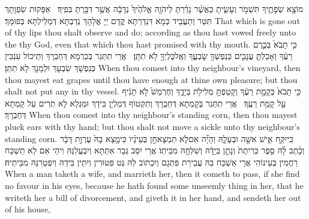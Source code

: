 {מוֹצָ֥א שְׂפָתֶ֖יךָ תִּשְׁמֹ֣ר וְעָשִׂ֑יתָ כַּאֲשֶׁ֨ר נָדַ֜רְתָּ לַיהֹוָ֤ה אֱלֹהֶ֙יךָ֙ נְדָבָ֔ה אֲשֶׁ֥ר דִּבַּ֖רְתָּ בְּפִֽיךָ׃ \setuma }
{אַפָּקוּת שִׂפְוָתָךְ תִּטַּר וְתַעֲבֵיד כְּמָא דִּנְדַרְתָּא קֳדָם יְיָ אֱלָהָךְ נְדַבְתָּא דְּמַלֵּילְתָּא בְּפוּמָּךְ׃}
{That which is gone out of thy lips thou shalt observe and do; according as thou hast vowed freely unto the \lord\space thy God, even that which thou hast promised with thy mouth.}{}
{כִּ֤י תָבֹא֙ בְּכֶ֣רֶם רֵעֶ֔ךָ וְאָכַלְתָּ֧ עֲנָבִ֛ים כְּנַפְשְׁךָ֖ שׇׂבְעֶ֑ךָ וְאֶֽל\maqqaf כֶּלְיְךָ֖ לֹ֥א תִתֵּֽן׃ \setuma }
{אֲרֵי תִתַּגַר בְּכַרְמָא דְּחַבְרָךְ וְתֵיכוֹל עִנְבִּין כְּנַפְשָׁךְ שִׂבְעָךְ וּלְמָנָךְ לָא תִתֵּן׃}
{When thou comest into thy neighbour’s vineyard, then thou mayest eat grapes until thou have enough at thine own pleasure; but thou shalt not put any in thy vessel.}{}
{כִּ֤י תָבֹא֙ בְּקָמַ֣ת רֵעֶ֔ךָ וְקָטַפְתָּ֥ מְלִילֹ֖ת בְּיָדֶ֑ךָ וְחֶרְמֵשׁ֙ לֹ֣א תָנִ֔יף עַ֖ל קָמַ֥ת רֵעֶֽךָ׃ \setuma }
{אֲרֵי תִתַּגַר בְּקָמְתָא דְּחַבְרָךְ וְתִקְטוֹף דְּמַלְיָן בִּידָךְ וּמַגְּלָא לָא תְרִים עַל קָמְתָא דְּחַבְרָךְ׃}
{When thou comest into thy neighbour’s standing corn, then thou mayest pluck ears with thy hand; but thou shalt not move a sickle unto thy neighbour’s standing corn.}{}
\newperek
{}%
{כִּֽי\maqqaf יִקַּ֥ח אִ֛ישׁ אִשָּׁ֖ה וּבְעָלָ֑הּ וְהָיָ֞ה אִם\maqqaf לֹ֧א תִמְצָא\maqqaf חֵ֣ן בְּעֵינָ֗יו כִּי\maqqaf מָ֤צָא בָהּ֙ עֶרְוַ֣ת דָּבָ֔ר וְכָ֨תַב לָ֜הּ סֵ֤פֶר כְּרִיתֻת֙ וְנָתַ֣ן בְּיָדָ֔הּ וְשִׁלְּחָ֖הּ מִבֵּיתֽוֹ׃}
{אֲרֵי יִסַּב גְּבַר אִתְּתָא וְיִבְעֲלִנַּהּ וִיהֵי אִם לָא תַשְׁכַּח רַחֲמִין בְּעֵינוֹהִי אֲרֵי אַשְׁכַּח בַּהּ עֲבֵירַת פִּתְגָם וְיִכְתוֹב לַהּ גֶּט פִּטּוּרִין וְיִתֵּין בִּידַהּ וְיִפְטְרִנַּהּ מִבֵּיתֵיהּ׃}
{When a man taketh a wife, and marrieth her, then it cometh to pass, if she find no favour in his eyes, because he hath found some unseemly thing in her, that he writeth her a bill of divorcement, and giveth it in her hand, and sendeth her out of his house,}{}
